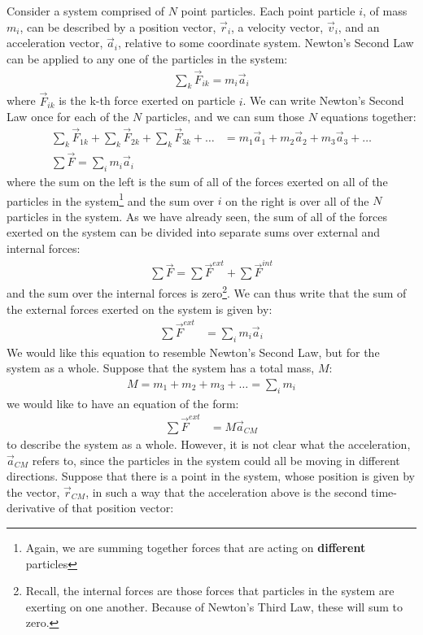 Consider a system comprised of $N$ point particles. Each point particle $i$, of mass $m_i$, can be described by a position vector, $\vec r_i$, a velocity vector, $\vec v_i$, and an acceleration vector, $\vec a_i$, relative to some coordinate system. Newton's Second Law can be applied to any one of the particles in the system:
\begin{align*}
\sum_k \vec F_{ik} = m_i \vec a_i
\end{align*}
where $\vec F_{ik}$ is the k-th force exerted on particle $i$. We can write Newton's Second Law once for each of the $N$ particles, and we can sum those $N$ equations together:
\begin{align*}
\sum_k \vec F_{1k} + \sum_k \vec F_{2k} + \sum_k \vec F_{3k} +\dots &= m_1\vec a_1 + m_2 \vec a_2 + m_3 \vec a_3 + \dots\\
\sum \vec F = \sum_i m_i \vec a_i 
\end{align*}
where the sum on the left is the sum of all of the forces exerted on all of the particles in the system\footnote{Again, we are summing together forces that are acting on \textbf{different} particles} and the sum over $i$ on the right is over all of the $N$ particles in the system. As we have already seen, the sum of all of the forces exerted on the system can be divided into separate sums over external and internal forces:
\begin{align*}
\sum \vec F = \sum \vec F^{ext} + \sum \vec F^{int} 
\end{align*}
and the sum over the internal forces is zero\footnote{Recall, the internal forces are those forces that particles in the system are exerting on one another. Because of Newton's Third Law, these will sum to zero.}. We can thus write that the sum of the external forces exerted on the system is given by:
\begin{align}
\label{eqn:momentumandcm:cmtemp1}
\sum \vec F^{ext}&= \sum_i m_i \vec a_i
\end{align}
We would like this equation to resemble Newton's Second Law, but for the system as a whole. Suppose that the system has a total mass, $M$:
\begin{align*}
M = m_1 + m_2 + m_3 +\dots = \sum_i m_i
\end{align*}
we would like to have an equation of the form:
\begin{align}
\label{eqn:momentumandcm:cmtemp2}
\sum \vec F^{ext}&=M\vec a_{CM}
\end{align}
to describe the system as a whole. However, it is not clear what the acceleration, $\vec a_{CM}$ refers to, since the particles in the system could all be moving in different directions. Suppose that there is a point in the system, whose position is given by the vector, $\vec r_{CM}$, in such a way that the acceleration above is the second time-derivative of that position vector:
